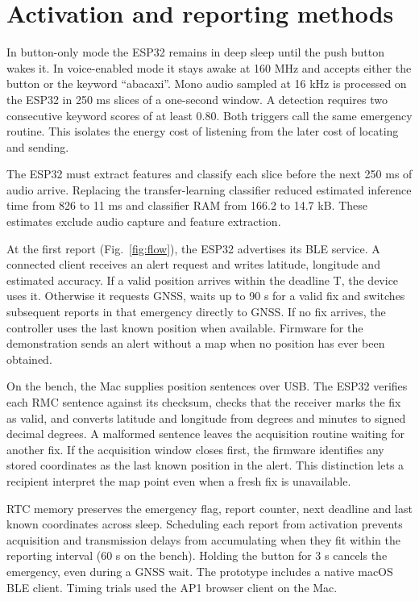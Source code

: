 \documentclass[english,hidelinks]{sbrt}
\begin{document}
\section{Activation and reporting methods}
In button-only mode the ESP32 remains in deep sleep until the push button wakes it. In voice-enabled mode it stays awake at 160 MHz and accepts either the button or the keyword ``abacaxi''. Mono audio sampled at 16 kHz is processed on the ESP32 in 250 ms slices of a one-second window. A detection requires two consecutive keyword scores of at least 0.80. Both triggers call the same emergency routine. This isolates the energy cost of listening from the later cost of locating and sending.

The ESP32 must extract features and classify each slice before the next 250 ms of audio arrive. Replacing the transfer-learning classifier reduced estimated inference time from 826 to 11 ms and classifier RAM from 166.2 to 14.7 kB. These estimates exclude audio capture and feature extraction.

At the first report (Fig.~\ref{fig:flow}), the ESP32 advertises its BLE service. A connected client receives an alert request and writes latitude, longitude and estimated accuracy. If a valid position arrives within the deadline T, the device uses it. Otherwise it requests GNSS, waits up to 90 s for a valid fix and switches subsequent reports in that emergency directly to GNSS. If no fix arrives, the controller uses the last known position when available. Firmware for the demonstration sends an alert without a map when no position has ever been obtained.

On the bench, the Mac supplies position sentences over USB. The ESP32 verifies each RMC sentence against its checksum, checks that the receiver marks the fix as valid, and converts latitude and longitude from degrees and minutes to signed decimal degrees. A malformed sentence leaves the acquisition routine waiting for another fix. If the acquisition window closes first, the firmware identifies any stored coordinates as the last known position in the alert. This distinction lets a recipient interpret the map point even when a fresh fix is unavailable.

RTC memory preserves the emergency flag, report counter, next deadline and last known coordinates across sleep. Scheduling each report from activation prevents acquisition and transmission delays from accumulating when they fit within the reporting interval (60 s on the bench). Holding the button for 3 s cancels the emergency, even during a GNSS wait. The prototype includes a native macOS BLE client. Timing trials used the AP1 browser client on the Mac.
\end{document}
